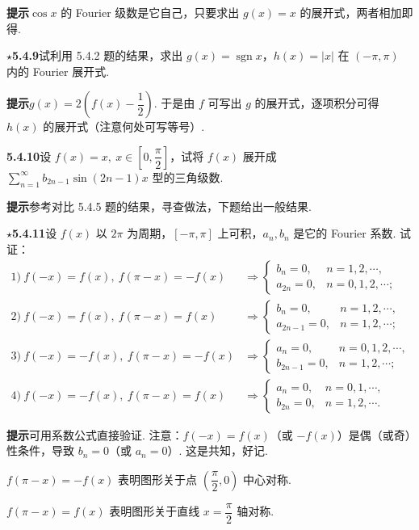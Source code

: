\documentclass[UTF8, 12pt, fontset=fandol, oneside]{ctexart}
\begin{document}
\noindent\textbf{提示}\quad $\cos x$ 的 Fourier 级数是它自己，只要求出 $g(x)=x$ 的展开式，两者相加即得.

\noindent\(\star\)\textbf{5.4.9}\quad 试利用 5.4.2 题的结果，求出 $g(x)=\operatorname{sgn}x$，$h(x)=|x|$ 在
$(-\pi,\pi)$ 内的 Fourier 展开式.

\noindent\textbf{提示}\quad $g(x)=2\left(f(x)-\dfrac12\right)$. 于是由 $f$ 可写出 $g$ 的展开式，逐项积分可得
$h(x)$ 的展开式（注意何处可写等号）.

\noindent\textbf{5.4.10}\quad 设 $f(x)=x,\ x\in\left[0,\dfrac{\pi}{2}\right]$，试将 $f(x)$ 展开成
$\displaystyle\sum_{n=1}^{\infty}b_{2n-1}\sin(2n-1)x$ 型的三角级数.

\noindent\textbf{提示}\quad 参考对比 5.4.5 题的结果，寻查做法，下题给出一般结果.

\noindent\(\star\)\textbf{5.4.11}\quad 设 $f(x)$ 以 $2\pi$ 为周期，$[-\pi,\pi]$ 上可积，$a_n,b_n$ 是它的 Fourier 系数. 试证：
\[
\begin{array}{ll}
1)\ f(-x)=f(x),\ f(\pi-x)=-f(x)
&\Rightarrow
\begin{cases}
b_n=0,&n=1,2,\cdots,\\
a_{2n}=0,&n=0,1,2,\cdots;
\end{cases}\\[10pt]
2)\ f(-x)=f(x),\ f(\pi-x)=f(x)
&\Rightarrow
\begin{cases}
b_n=0,&n=1,2,\cdots,\\
a_{2n-1}=0,&n=1,2,\cdots;
\end{cases}\\[10pt]
3)\ f(-x)=-f(x),\ f(\pi-x)=-f(x)
&\Rightarrow
\begin{cases}
a_n=0,&n=0,1,2,\cdots,\\
b_{2n-1}=0,&n=1,2,\cdots;
\end{cases}\\[10pt]
4)\ f(-x)=-f(x),\ f(\pi-x)=f(x)
&\Rightarrow
\begin{cases}
a_n=0,&n=0,1,\cdots,\\
b_{2n}=0,&n=1,2,\cdots.
\end{cases}
\end{array}
\]

\noindent\textbf{提示}\quad 可用系数公式直接验证. 注意：$f(-x)=f(x)$（或 $-f(x)$）是偶（或奇）性条件，导致
$b_n=0$（或 $a_n=0$）. 这是共知，好记.

$f(\pi-x)=-f(x)$ 表明图形关于点 $\left(\dfrac{\pi}{2},0\right)$ 中心对称.

$f(\pi-x)=f(x)$ 表明图形关于直线 $x=\dfrac{\pi}{2}$ 轴对称.
\end{document}
